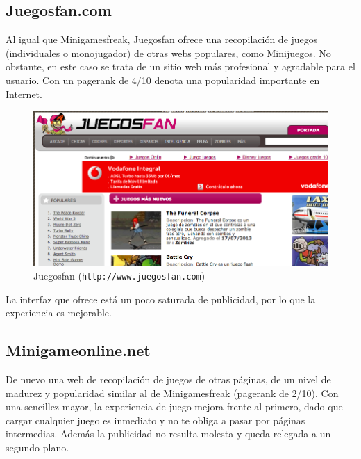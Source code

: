 \subsection*{Juegosfan.com}

Al igual que Minigamesfreak, Juegosfan ofrece una recopilación de juegos (individuales o monojugador) de otras webs populares, como Minijuegos. No obstante, en este caso se trata de un sitio web más profesional y agradable para el usuario. Con un pagerank de 4/10 denota una popularidad importante en Internet.

\begin{figure}[h]
  \begin{center}
    \includegraphics[width=\textwidth]{images/juegosfan.png}
    \caption{Juegosfan ({\tt http://www.juegosfan.com})}
    \label{fig::juegosfan}
  \end{center}
\end{figure}

La interfaz que ofrece está un poco saturada de publicidad, por lo que la experiencia es mejorable.

\subsection*{Minigameonline.net}

De nuevo una web de recopilación de juegos de otras páginas, de un nivel de madurez y popularidad similar al de Minigamesfreak (pagerank de 2/10). Con una sencillez mayor, la experiencia de juego mejora frente al primero, dado que cargar cualquier juego es inmediato y no te obliga a pasar por páginas intermedias. Además la publicidad no resulta molesta y queda relegada a un segundo plano.

